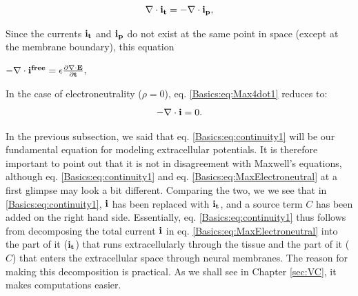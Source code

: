 \begin{equation}
\nabla \cdot {\bf i_t} =  -\nabla \cdot {\bf i_p},
\label{Basics:eq:Max4dot1}
\end{equation}

Since the currents ${\bf i_t}$ and  ${\bf i_p}$ do not exist at the same point in space (except at the membrane boundary), this equation


$- \nabla \cdot \bf{i^{free}} =  \epsilon \frac{\partial {\bf \nabla \cdot E}}{\partial t}, $


In the case of electroneutrality ($\rho = 0$), eq. \ref{Basics:eq:Max4dot1} reduces to:
\begin{equation}
- \nabla \cdot {\bf i} =  0.
\label{Basics:eq:MaxElectroneutral}
\end{equation}


In the previous subsection, we said that eq. \ref{Basics:eq:continuity1} will be our fundamental equation for modeling extracellular potentials. It is therefore important to point out that it is not in disagreement with Maxwell's equations, although eq. \ref{Basics:eq:continuity1} and eq. \ref{Basics:eq:MaxElectroneutral} at a first glimpse may look a bit different. Comparing the two, we we see that in \ref{Basics:eq:continuity1}, ${\bf i}$ has been replaced with ${\bf i_t}$, and a source term $C$ has been added on the right hand side. Essentially, eq. \ref{Basics:eq:continuity1} thus follows from decomposing the total current ${\bf i}$ in eq. \ref{Basics:eq:MaxElectroneutral} into the part of it ($\bf{i_t}$) that runs extracellularly through the tissue and the part of it ($C$) that enters the extracellular space through neural membranes. The reason for making this decomposition is practical. As we shall see in Chapter \ref{sec:VC}, it makes computations easier.





